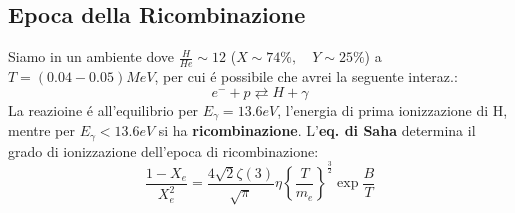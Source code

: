 \documentclass[12pt, a4paper]{article}
\begin{document}
\subsection{Epoca della Ricombinazione}
Siamo in un ambiente dove $\frac{H}{He}\sim 12$ ($X\sim 74\%, \quad
Y\sim 25\%$) a $T=(0.04 - 0.05)MeV$, per cui \'{e} possibile che avrei la seguente interaz.:
\begin{equation}
       e^{-} + p \rightleftarrows H + \gamma
\end{equation}
La reazioine \'{e} all'equilibrio per $E_{\gamma}=13.6 eV$, l'energia di prima ionizzazione di H, mentre per $E_{\gamma}<13.6 eV$ si ha \textbf{ricombinazione}. L'\textbf{eq. di Saha} determina il grado di ionizzazione dell'epoca di ricombinazione:
\begin{equation}
\frac{1-X_e}{X_e^2}=\frac{4\sqrt{2} \zeta(3)}{\sqrt{\pi}}\eta \left\{ \frac{T}{m_e}\right\}^{\frac{3}{2}} \exp{\frac{B}{T}}
\end{equation}
\end{document}
